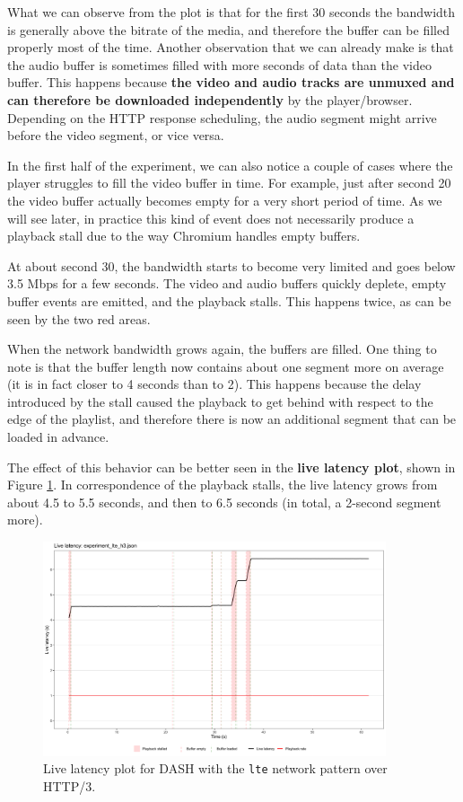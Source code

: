 What we can observe from the plot is that for the first 30 seconds the bandwidth is generally above the bitrate of the media, and therefore the buffer can be filled properly most of the time. Another observation that we can already make is that the audio buffer is sometimes filled with more seconds of data than the video buffer. This happens because \textbf{the video and audio tracks are unmuxed and can therefore be downloaded independently} by the player/browser. Depending on the HTTP response scheduling, the audio segment might arrive before the video segment, or vice versa.

In the first half of the experiment, we can also notice a couple of cases where the player struggles to fill the video buffer in time. For example, just after second 20 the video buffer actually becomes empty for a very short period of time. As we will see later, in practice this kind of event does not necessarily produce a playback stall due to the way Chromium handles empty buffers.

At about second 30, the bandwidth starts to become very limited and goes below 3.5 Mbps for a few seconds. The video and audio buffers quickly deplete, empty buffer events are emitted, and the playback stalls. This happens twice, as can be seen by the two red areas.

When the network bandwidth grows again, the buffers are filled. One thing to note is that the buffer length now contains about one segment more on average (it is in fact closer to 4 seconds than to 2). This happens because the delay introduced by the stall caused the playback to get behind with respect to the edge of the playlist, and therefore there is now an additional segment that can be loaded in advance.

The effect of this behavior can be better seen in the \textbf{live latency plot}, shown in Figure \ref{fig:eval_nonabr_lte_h3_latency}. In correspondence of the playback stalls, the live latency grows from about 4.5 to 5.5 seconds, and then to 6.5 seconds (in total, a 2-second segment more).

\begin{figure}[h]
    \centering
    \includegraphics[width=0.9\textwidth]{res/eval_nonabr_lte_h3_latency.png}
    \caption{Live latency plot for DASH with the \texttt{lte} network pattern over HTTP/3.}
    \label{fig:eval_nonabr_lte_h3_latency}
\end{figure}

